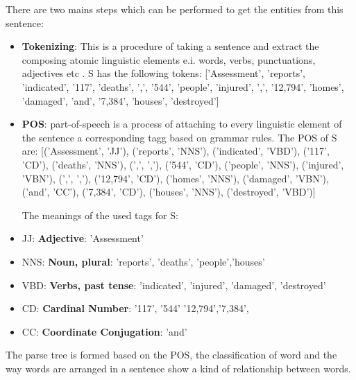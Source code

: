 There are two mains steps which can be performed to get the entities from  this sentence:
\begin{itemize}
\item \textbf{Tokenizing}: This is a procedure of taking a sentence and extract the composing atomic linguistic elements e.i. words, verbs, punctuations, adjectives etc .
S has the following tokens: ['Assessment', 'reports', 'indicated', '117', 'deaths', ',', '544', 'people', 'injured', ',', '12,794', 'homes', 'damaged', 'and', '7,384', 'houses', 'destroyed']
\item \textbf{POS}: part-of-speech is a process of attaching to every linguistic element of the sentence a corresponding tagg based on grammar rules.
The POS of S  are: 
[('Assessment', 'JJ'), ('reports', 'NNS'), ('indicated', 'VBD'), ('117', 'CD'), ('deaths', 'NNS'), (',', ','), ('544', 'CD'), ('people', 'NNS'), ('injured', 'VBN'), (',', ','), ('12,794', 'CD'), ('homes', 'NNS'), ('damaged', 'VBN'), ('and', 'CC'), ('7,384', 'CD'), ('houses', 'NNS'), ('destroyed', 'VBD')]

The meanings of the used tags for S:
\end{itemize}
\begin{itemize}
\item JJ: \textbf{Adjective}: 'Assessment'   
\item NNS: \textbf{Noun, plural}: 'reports', 'deaths', 'people','houses'
\item VBD: \textbf{Verbs, past tense}: 'indicated',             'injured', 'damaged', 'destroyed'
\item CD: \textbf{Cardinal Number}: '117', '544' '12,794','7,384',
\item CC: \textbf{Coordinate Conjugation}: 'and'
\end{itemize}
The parse tree is formed based on the POS, the classification of word and the way words are arranged in a sentence show a kind of relationship between words.



